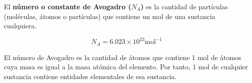 \begin{warncard}[adjusted title={Constante de Abogadro}]
    El \textbf{número o constante de Avogadro ($N_A$)} es la cantidad de partículas (moléculas, átomos o partículas) que contiene un mol de una sustancia cualquiera.

        {\large
            \[ N_A=6.023 \times 10^{23} \text{mol}^{-1}\]
        }

    El número de Avogadro es la cantidad de átomos que contiene 1 mol de átomos cuya masa es igual a la masa atómica del elemento.
    Por tanto, 1 mol de cualquier sustancia contiene  entidades elementales de esa sustancia.
\end{warncard}